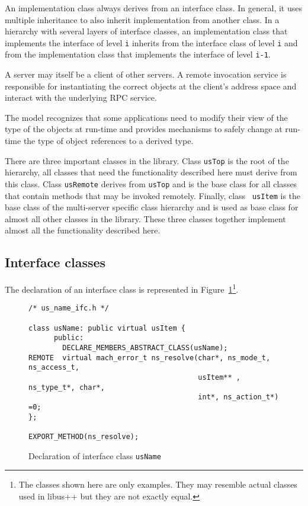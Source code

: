 An implementation class always derives from an interface class. In
general, it uses multiple inheritance to also 
inherit implementation from another class. In a hierarchy with several
layers of interface classes, an implementation class that implements
the interface of level {\tt i} inherits from the interface class of
level {\tt i} and from the implementation class that implements the
interface of level {\tt i-1}.

A server may itself be a client of other servers.
A remote invocation service is responsible for instantiating the
correct objects at the client's address space and interact with the
underlying RPC service.

The model recognizes that some applications need to modify their view
of the type of the objects at run-time and provides mechanisms to
safely change at run-time the type of object references to a derived
type. 

There are three important classes in the library. Class {\tt usTop} is
the root of the hierarchy, all classes that need the functionality
described here must derive from this class. Class {\tt usRemote}
derives from {\tt usTop} and is the base class for all classes that
contain methods that may be invoked remotely. Finally, class {\tt
usItem} is the base class of the multi-server specific class hierarchy
and is used as base class for almost all other classes in the library.
These three classes together implement almost all the functionality
described here.

\subsection{Interface classes}

The declaration of an interface class is represented in
Figure~\ref{us_name_ifc}\footnote{The classes shown here are only
examples. They may resemble actual classes used in libus++ but they
are not exactly equal.}.

\begin{figure}[htbp]
{\footnotesize
\begin{verbatim}
/* us_name_ifc.h */

class usName: public virtual usItem {
      public:
        DECLARE_MEMBERS_ABSTRACT_CLASS(usName);
REMOTE  virtual mach_error_t ns_resolve(char*, ns_mode_t, ns_access_t, 
                                        usItem** , ns_type_t*, char*, 
                                        int*, ns_action_t*) =0;
};

EXPORT_METHOD(ns_resolve);
\end{verbatim}
}
\caption{Declaration of interface class {\tt usName}}
\label{us_name_ifc}
\end{figure}

